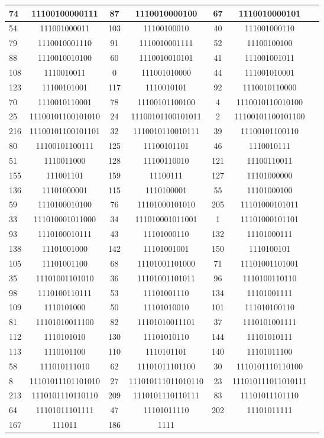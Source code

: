 \documentclass[conference,onecolumn,12pt]{IEEEtran}
\numberwithin{equation}{subsection}
\begin{document}
\begin{table}[h]
\begin{tabular}{lcccccc}
74 & 11100100000111 & 87 & 1110010000100 & 67 & 1110010000101 \\ \hline
54 & 111001000011 & 103 & 11100100010 & 40 & 111001000110 \\ \hline
79 & 1110010001110 & 91 & 1110010001111 & 52 & 11100100100 \\ \hline
88 & 1110010010100 & 60 & 1110010010101 & 41 & 111001001011 \\ \hline
108 & 1110010011 & 0 & 111001010000 & 44 & 111001010001 \\ \hline
123 & 11100101001 & 117 & 1110010101 & 92 & 1110010110000 \\ \hline
70 & 1110010110001 & 78 & 11100101100100 & 4 & 1110010110010100 \\ \hline
25 & 11100101100101010 & 24 & 11100101100101011 & 2 & 11100101100101100 \\ \hline
216 & 11100101100101101 & 32 & 1110010110010111 & 39 & 11100101100110 \\ \hline
80 & 11100101100111 & 125 & 11100101101 & 46 & 1110010111 \\ \hline
51 & 1110011000 & 128 & 11100110010 & 121 & 11100110011 \\ \hline
155 & 111001101 & 159 & 11100111 & 127 & 11101000000 \\ \hline
136 & 11101000001 & 115 & 1110100001 & 55 & 11101000100 \\ \hline
59 & 1110100010100 & 76 & 11101000101010 & 205 & 11101000101011 \\ \hline
33 & 111010001011000 & 34 & 111010001011001 & 1 & 11101000101101 \\ \hline
93 & 1110100010111 & 43 & 11101000110 & 132 & 11101000111 \\ \hline
138 & 11101001000 & 142 & 11101001001 & 150 & 1110100101 \\ \hline
105 & 11101001100 & 68 & 11101001101000 & 71 & 11101001101001 \\ \hline
35 & 11101001101010 & 36 & 11101001101011 & 96 & 1110100110110 \\ \hline
98 & 1110100110111 & 53 & 11101001110 & 134 & 11101001111 \\ \hline
109 & 1110101000 & 50 & 11101010010 & 101 & 111010100110 \\ \hline
81 & 11101010011100 & 82 & 11101010011101 & 37 & 1110101001111 \\ \hline
112 & 1110101010 & 130 & 11101010110 & 144 & 11101010111 \\ \hline
113 & 1110101100 & 110 & 1110101101 & 140 & 11101011100 \\ \hline
58 & 111010111010 & 62 & 11101011101100 & 30 & 1110101110110100 \\ \hline
8 & 11101011101101010 & 27 & 111010111011010110 & 23 & 111010111011010111 \\ \hline
213 & 1110101110110110 & 209 & 1110101110110111 & 83 & 11101011101110 \\ \hline
64 & 11101011101111 & 47 & 11101011110 & 202 & 11101011111 \\ \hline
167 & 111011 & 186 & 1111 &  &  \\ \hline
\end{tabular}
\end{table}
\end{document}
